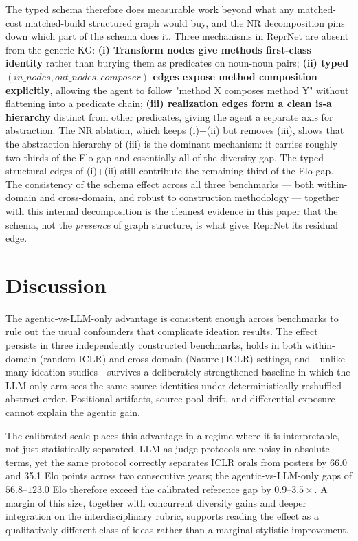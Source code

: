 \documentclass[10pt,twocolumn]{article}
\begin{document}
The typed schema therefore does measurable work beyond what any
matched-cost matched-build structured graph would buy, and the NR
decomposition pins down which part of the schema does it.  Three
mechanisms in ReprNet are absent from the generic KG:
\textbf{(i) Transform nodes give methods first-class identity}
rather than burying them as predicates on noun-noun pairs;
\textbf{(ii) typed $(in\_nodes, out\_nodes, composer)$ edges
expose method composition explicitly}, allowing the agent to
follow "method X composes method Y" without flattening into a
predicate chain; \textbf{(iii) realization edges form a clean
is-a hierarchy} distinct from other predicates, giving the agent
a separate axis for abstraction.  The NR ablation, which keeps
(i)+(ii) but removes (iii), shows that the abstraction hierarchy
of (iii) is the dominant mechanism: it carries roughly two thirds
of the Elo gap and essentially all of the diversity gap.  The
typed structural edges of (i)+(ii) still contribute the remaining
third of the Elo gap.  The consistency of the schema effect across
all three benchmarks --- both within-domain and cross-domain, and
robust to construction methodology --- together with this internal
decomposition is the cleanest evidence in this paper that the
schema, not the \emph{presence} of graph structure, is what gives
ReprNet its residual edge.

\clearpage

\section{Discussion}

The agentic-vs-LLM-only advantage is consistent enough across
benchmarks to rule out the usual confounders that complicate ideation
results.  The effect persists in three independently constructed
benchmarks, holds in both within-domain (random ICLR) and cross-domain
(Nature+ICLR) settings, and---unlike many ideation studies---survives
a deliberately strengthened baseline in which the LLM-only arm sees the
same source identities under deterministically reshuffled abstract
order.  Positional artifacts, source-pool drift, and differential
exposure cannot explain the agentic gain.

The calibrated scale places this advantage in a regime where it is
interpretable, not just statistically separated.  LLM-as-judge
protocols are noisy in absolute terms, yet the same protocol correctly
separates ICLR orals from posters by 66.0 and 35.1 Elo points across
two consecutive years; the agentic-vs-LLM-only gaps of $56.8$--$123.0$
Elo therefore exceed the calibrated reference gap by
$0.9$--$3.5\times$.  A margin of this size, together with concurrent
diversity gains and deeper integration on the interdisciplinary
rubric, supports reading the effect as a qualitatively different class
of ideas rather than a marginal stylistic improvement.
\end{document}
